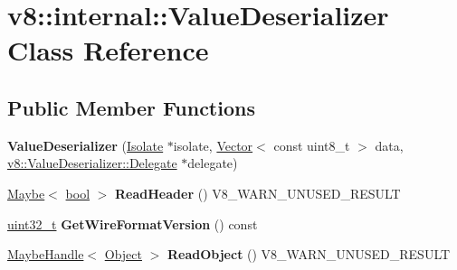 \hypertarget{classv8_1_1internal_1_1ValueDeserializer}{}\section{v8\+:\+:internal\+:\+:Value\+Deserializer Class Reference}
\label{classv8_1_1internal_1_1ValueDeserializer}
\subsection*{Public Member Functions}
\begin{DoxyCompactItemize}
\item 
\mbox{\label{classv8_1_1internal_1_1ValueDeserializer_a054cbf437b495a52998a0495ce8cee26}} 
{\bfseries Value\+Deserializer} (\mbox{\hyperlink{classv8_1_1internal_1_1Isolate}{Isolate}} $\ast$isolate, \mbox{\hyperlink{classv8_1_1internal_1_1Vector}{Vector}}$<$ const uint8\+\_\+t $>$ data, \mbox{\hyperlink{classv8_1_1ValueDeserializer_1_1Delegate}{v8\+::\+Value\+Deserializer\+::\+Delegate}} $\ast$delegate)
\item 
\mbox{\label{classv8_1_1internal_1_1ValueDeserializer_a53ad63d94912ceed93d934b0d0ca4a5a}} 
\mbox{\hyperlink{classv8_1_1Maybe}{Maybe}}$<$ \mbox{\hyperlink{classbool}{bool}} $>$ {\bfseries Read\+Header} () V8\+\_\+\+W\+A\+R\+N\+\_\+\+U\+N\+U\+S\+E\+D\+\_\+\+R\+E\+S\+U\+LT
\item 
\mbox{\label{classv8_1_1internal_1_1ValueDeserializer_a636fcd5f4f8fc79e7b05450063fe961b}} 
\mbox{\hyperlink{classuint32__t}{uint32\+\_\+t}} {\bfseries Get\+Wire\+Format\+Version} () const
\item 
\mbox{\label{classv8_1_1internal_1_1ValueDeserializer_a755c6c18b9cb33753cd4055a44e81ef5}} 
\mbox{\hyperlink{classv8_1_1internal_1_1MaybeHandle}{Maybe\+Handle}}$<$ \mbox{\hyperlink{classv8_1_1internal_1_1Object}{Object}} $>$ {\bfseries Read\+Object} () V8\+\_\+\+W\+A\+R\+N\+\_\+\+U\+N\+U\+S\+E\+D\+\_\+\+R\+E\+S\+U\+LT
\item 
\mbox{\label{classv8_1_1internal_1_1ValueDeserializer_a6fd426957aa8ea42dec1d356fb754ef1}} 

\end{DoxyCompactItemize}
